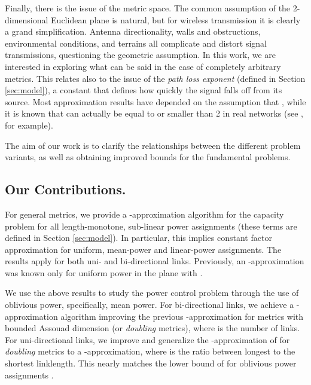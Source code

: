 \documentclass[11pt]{amsart}
\begin{document}
Finally, there is the issue of the metric space.
The common assumption of the 2-dimensional Euclidean plane is 
natural, but for wireless transmission it is clearly a grand simplification.
Antenna directionality, walls and obstructions, 
environmental conditions, and terrains all complicate and distort signal
transmissions, questioning the geometric assumption. 
In this work, we are interested in exploring what can be said in the case of
completely arbitrary metrics. 
This relates also to the issue of the \emph{path loss exponent} 
 (defined in Section \ref{sec:model}),
a constant that defines how quickly the signal falls off from its source. 
Most approximation results have depended on the 
assumption that 
\cite{moscibroda06b,MoscibrodaOW07,chafekar07,GHWW09,HW09}, while it
is known that  can actually be equal to or smaller
than 2 in real networks (see \cite{SWTFA95}, for example). 


The aim of our work is to clarify the relationships between the
different problem variants, as well as obtaining improved bounds for
the fundamental problems.

\subsection{Our Contributions.}




For general metrics, we
provide a -approximation algorithm for the capacity problem for all length-monotone, sub-linear
power assignments (these terms are defined in Section \ref{sec:model}). In particular, this implies constant factor approximation for uniform, mean-power
and linear-power assignments. The results apply for both uni- and bi-directional links. Previously,
an -approximation was known only for uniform power 
in the plane with  \cite{HW09}. 

We use the above results to study the power control problem through the use of oblivious power, specifically, mean power.
For bi-directional links,
we achieve a -approximation algorithm 
improving the previous -approximation for metrics with bounded Assouad dimension (or \emph{doubling} metrics)\cite{us:esa09full}, where  is the number of links.
For uni-directional links, we improve and generalize the -approximation of \cite{us:esa09full} for
\emph{doubling} metrics to a -approximation, 
where  is the ratio between longest to the shortest linklength.
This nearly matches the lower bound of  for oblivious power assignments \cite{us:esa09full}.
\end{document}
